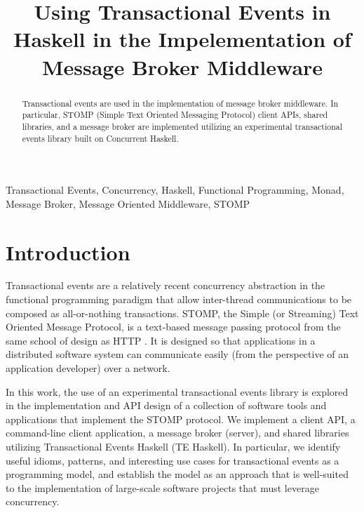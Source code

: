 \documentclass[conference, letterpaper]{IEEEtran}
\begin{document}
\title{Using Transactional Events in Haskell in the Impelementation of Message Broker Middleware}

\author{
}

\maketitle

\begin{abstract}
Transactional events are used in the  implementation of message broker middleware. In particular, STOMP 
(Simple Text Oriented Messaging Protocol) client APIs, shared libraries, and a message broker are implemented 
utilizing an experimental transactional events library built on Concurrent Haskell.
\end{abstract}

\begin{IEEEkeywords}
Transactional Events, Concurrency, Haskell, Functional Programming, Monad, Message Broker, 
Message Oriented Middleware, STOMP
\end{IEEEkeywords}

\IEEEpeerreviewmaketitle

\section{Introduction}

Transactional events are a relatively recent concurrency abstraction in the functional programming
paradigm that allow inter-thread communications to be composed as all-or-nothing transactions. STOMP, the Simple (or Streaming) Text Oriented Message Protocol, is a text-based message passing protocol from the same school of design as HTTP \cite{stomp:spec}. It is designed so that applications in a distributed software system can communicate easily (from the perspective of an application developer) over a network. 

In this work, the use of an experimental transactional events library is explored in the implementation and API design of a collection of software tools and applications that implement the STOMP protocol. We implement a client API, a command-line client application, a message broker (server), and shared libraries utilizing 
Transactional Events Haskell (TE Haskell). In particular, we identify useful idioms, patterns,
and interesting use cases for transactional events as a programming model, and establish the model as an approach that is well-suited to the implementation of large-scale software projects that must leverage concurrency.
\end{document}
